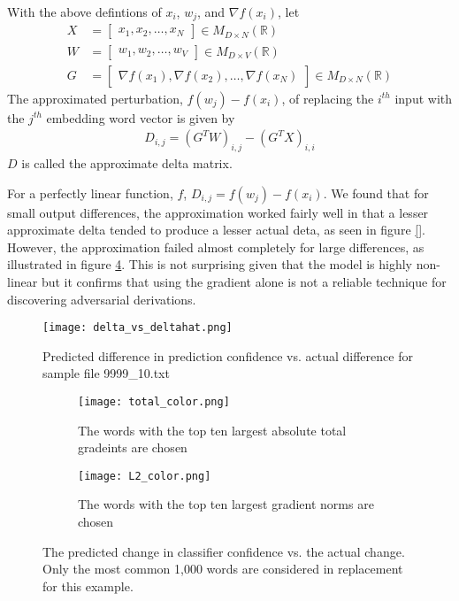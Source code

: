 \begin{definition}

With the above defintions of $x_i$, $w_j$, and $\nabla f(x_i)$, let
\begin{align}
X &= 
\begin{bmatrix}
x_1, x_2, \dots, x_N
\end{bmatrix} \in M_{D\times N}(\mathbb{R})\\
W &= 
\begin{bmatrix}
w_1, w_2, \dots, w_V
\end{bmatrix} \in M_{D\times V}(\mathbb{R})\\
G &= 
\begin{bmatrix}
\nabla f(x_1), \nabla f(x_2), \dots, \nabla f(x_N)
\end{bmatrix} \in M_{D\times N}(\mathbb{R})
\end{align}
\noindent
The approximated perturbation, $f(w_j)-f(x_i)$, of replacing the $i^{th}$ input with the $j^{th}$ embedding word vector is given by 
\begin{align}
    D_{i,j} = (G^TW)_{i,j} - (G^TX)_{i,i}
\end{align}
\noindent
$D$ is called the approximate delta matrix.
\end{definition}
\noindent
For a perfectly linear function, $f$, $D_{i,j} = f(w_j) - f(x_i)$.  We found that for small output differences, the approximation worked fairly well in that a lesser approximate delta tended to produce a lesser actual deta, as seen in figure \ref{}.  However, the approximation failed almost completely for large differences, as illustrated in figure \ref{fig:outliers}.  This is not surprising given that the model is highly non-linear but it confirms that using the gradient alone is not a reliable technique for discovering adversarial derivations.

\begin{figure}
    \centering
    \texttt{[image: delta\_vs\_deltahat.png]}
    \caption{Predicted difference in prediction confidence vs. actual difference for sample file 9999\_10.txt}
    \label{fig:saliency}
\end{figure}

\begin{figure}
\centering
\begin{subfigure}[t]{0.45\textwidth}
  \centering
  \texttt{[image: total\_color.png]}
  \caption{The words with the top ten largest absolute total gradeints are chosen}
  \label{fig:total_color}
\end{subfigure}\hfill
\begin{subfigure}[t]{0.45\textwidth}
  \centering
  \texttt{[image: L2\_color.png]}
  \caption{The words with the top ten largest gradient norms are chosen}
  \label{fig:norm_color}
\end{subfigure}
\caption{The predicted change in classifier confidence vs. the actual change.  Only the most common 1,000 words are considered in replacement for this example.}
\label{fig:outliers}
\end{figure}


